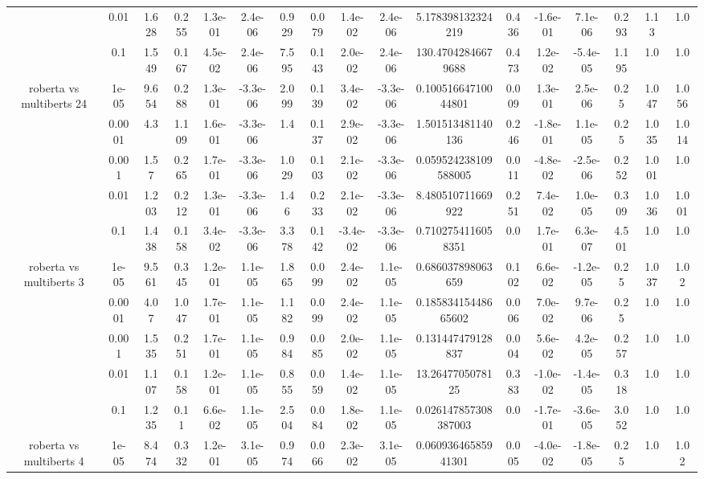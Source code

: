 \begin{tabular}{|c|c|c|c|c|c|c|c|c|c|c|c|c|c|c|c|c|}
 & 0.01 & 1.628 & 0.255 & 1.3e-01 & 2.4e-06 & 0.929 & 0.079 & 1.4e-02 & 2.4e-06 & 5.178398132324219 & 0.436 & -1.6e-01 & 7.1e-06 & 0.293 & 1.13 & 1.0 \\
 & 0.1 & 1.549 & 0.167 & 4.5e-02 & 2.4e-06 & 7.595 & 0.143 & 2.0e-02 & 2.4e-06 & 130.47042846679688 & 0.473 & 1.2e-02 & -5.4e-05 & 1.195 & 1.0 & 1.0 \\
\hline
\multirow{5}{*}{roberta  vs multiberts 24} & 1e-05 & 9.654 & 0.288 & 1.3e-01 & -3.3e-06 & 2.099 & 0.139 & 3.4e-02 & -3.3e-06 & 0.10051664710044801 & 0.009 & 1.3e-01 & 2.5e-06 & 0.25 & 1.047 & 1.056 \\
 & 0.0001 & 4.3 & 1.109 & 1.6e-01 & -3.3e-06 & 1.4 & 0.137 & 2.9e-02 & -3.3e-06 & 1.501513481140136 & 0.246 & -1.8e-01 & 1.1e-05 & 0.25 & 1.035 & 1.014 \\
 & 0.001 & 1.57 & 0.265 & 1.7e-01 & -3.3e-06 & 1.029 & 0.103 & 2.1e-02 & -3.3e-06 & 0.059524238109588005 & 0.011 & -4.8e-02 & -2.5e-06 & 0.252 & 1.001 & 1.0 \\
 & 0.01 & 1.203 & 0.212 & 1.3e-01 & -3.3e-06 & 1.46 & 0.233 & 2.1e-02 & -3.3e-06 & 8.480510711669922 & 0.251 & 7.4e-02 & 1.0e-05 & 0.309 & 1.036 & 1.001 \\
 & 0.1 & 1.438 & 0.158 & 3.4e-02 & -3.3e-06 & 3.378 & 0.142 & -3.4e-02 & -3.3e-06 & 0.7102754116058351 & 0.0 & 1.7e-01 & 6.3e-07 & 4.501 & 1.0 & 1.0 \\
\hline
\multirow{5}{*}{roberta  vs multiberts 3} & 1e-05 & 9.561 & 0.345 & 1.2e-01 & 1.1e-05 & 1.865 & 0.099 & 2.4e-02 & 1.1e-05 & 0.686037898063659 & 0.102 & 6.6e-02 & -1.2e-05 & 0.25 & 1.037 & 1.02 \\
 & 0.0001 & 4.07 & 1.047 & 1.7e-01 & 1.1e-05 & 1.182 & 0.099 & 2.4e-02 & 1.1e-05 & 0.18583415448665602 & 0.006 & 7.0e-02 & 9.7e-06 & 0.25 & 1.0 & 1.0 \\
 & 0.001 & 1.535 & 0.251 & 1.7e-01 & 1.1e-05 & 0.984 & 0.085 & 2.0e-02 & 1.1e-05 & 0.131447479128837 & 0.004 & 5.6e-02 & 4.2e-05 & 0.257 & 1.0 & 1.0 \\
 & 0.01 & 1.107 & 0.158 & 1.2e-01 & 1.1e-05 & 0.855 & 0.059 & 1.4e-02 & 1.1e-05 & 13.2647705078125 & 0.383 & -1.0e-02 & -1.4e-05 & 0.318 & 1.0 & 1.0 \\
 & 0.1 & 1.235 & 0.11 & 6.6e-02 & 1.1e-05 & 2.504 & 0.084 & 1.8e-02 & 1.1e-05 & 0.026147857308387003 & 0.0 & -1.7e-01 & -3.6e-05 & 3.052 & 1.0 & 1.0 \\
\hline
\multirow{5}{*}{roberta  vs multiberts 4} & 1e-05 & 8.474 & 0.332 & 1.2e-01 & 3.1e-05 & 0.974 & 0.066 & 2.3e-02 & 3.1e-05 & 0.06093646585941301 & 0.005 & -4.0e-02 & -1.8e-05 & 0.25 & 1.0 & 1.02 \\

\end{tabular}
